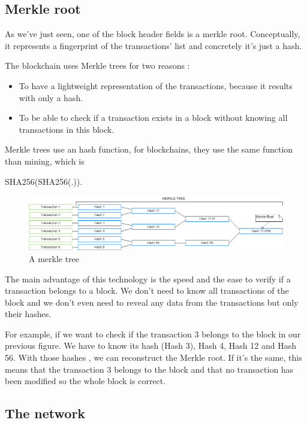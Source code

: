   \subsection{Merkle root} \label{merkleRoot}

  As we've just seen, one of the block header fields is a merkle root. Conceptually, it represents a fingerprint of the transactions' list and concretely it's just a hash.

  The blockchain uses Merkle trees for two reasons :

  \begin{itemize}
    \item To have a lightweight representation of the transactions, because it results with only a hash.
    \item To be able to check if a transaction exists in a block without knowing all transactions in this block.
  \end{itemize}

  Merkle trees use an hash function, for blockchains, they use the same function than mining, which is

  SHA256(SHA256(.)).

  \begin{figure}[h]
  \centering
  \includegraphics[width=\textwidth]{Figures/merkleTree}
  \caption{A merkle tree}
  \end{figure}
  \medskip

  The main advantage of this technology is the speed and the ease to verify if a transaction belongs to a block. We don't need to know all transactions of the block and we don't even need to reveal any data from the transactions but only their hashes. \newline

  For example, if we want to check if the transaction 3 belongs to the block in our previous figure. We have to know its hash (Hash 3), Hash 4, Hash 12 and Hash 56. With those hashes , we can reconstruct the Merkle root. If it's the same, this means that the transaction 3 belongs to the block and that no transaction has been modified so the whole block is correct.

  \subsection{The network}

